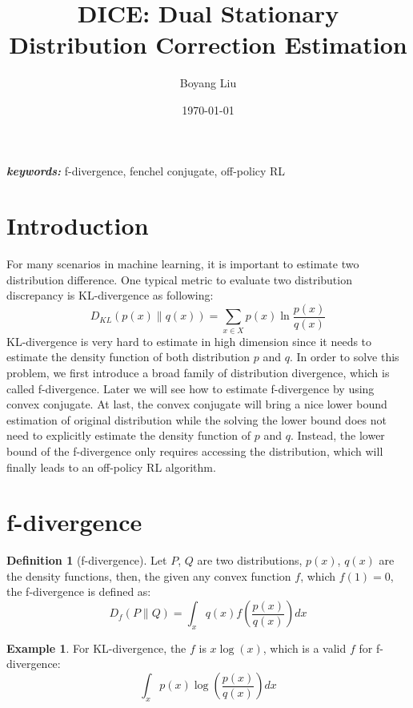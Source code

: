 \documentclass[a4paper]{article}
\title{DICE: Dual Stationary Distribution Correction Estimation}
\author{Boyang Liu}
\date{\today}
\theoremstyle{definition}
\newtheorem{defn}{Definition}[section]
\newtheorem{exmp}{Example}[section]
\providecommand{\keywords}[1]{\textbf{\textit{keywords: }} #1}
\begin{document}
\maketitle


\keywords{f-divergence, fenchel conjugate, off-policy RL}

\section{Introduction}
For many scenarios in machine learning, it is important to estimate two distribution difference. One typical metric to evaluate two distribution discrepancy is KL-divergence as following:
\begin{equation}
D_{K L}(p(x) \| q(x))=\sum_{x \in X} p(x) \ln \frac{p(x)}{q(x)}
\end{equation}
KL-divergence is very hard to estimate in high dimension since it needs to estimate the density function of both distribution $p$ and $q$. In order to solve this problem, we first introduce a broad family of distribution divergence, which is called f-divergence. Later we will see how to estimate f-divergence by using convex conjugate. At last, the convex conjugate will bring a nice lower bound estimation of original distribution while the solving the lower bound does not need to explicitly estimate the density function of $p$ and $q$. Instead, the lower bound of the f-divergence only requires accessing the distribution, which will finally leads to an off-policy RL algorithm.

\section{f-divergence}
\begin{defn}[f-divergence]
Let $P$, $Q$ are two distributions, $p(x)$, $q(x)$ are the density functions, then, the given any convex function $f$, which $f(1)=0$, the f-divergence is defined as:
\begin{equation}
D_{f}(P \| Q)=\int_{x} q(x) f\left(\frac{p(x)}{q(x)}\right) d x
\end{equation}
\end{defn}

\begin{exmp}
For KL-divergence, the $f$ is $x\log(x)$, which is a valid $f$ for f-divergence: $$
\int_{x} p(x) \log \left(\frac{p(x)}{q(x)}\right) d x
$$
\end{exmp}
\end{document}
